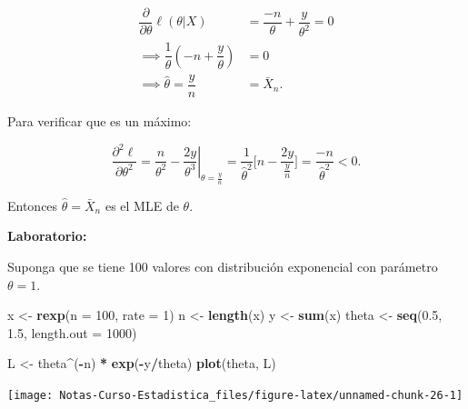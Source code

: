 \documentclass[
  12pt,
]{book}
\newenvironment{Shaded}{\begin{snugshade}}{\end{snugshade}}
\newcommand{\DataTypeTok}[1]{\textcolor[rgb]{0.13,0.29,0.53}{#1}}
\newcommand{\DecValTok}[1]{\textcolor[rgb]{0.00,0.00,0.81}{#1}}
\newcommand{\FloatTok}[1]{\textcolor[rgb]{0.00,0.00,0.81}{#1}}
\newcommand{\KeywordTok}[1]{\textcolor[rgb]{0.13,0.29,0.53}{\textbf{#1}}}
\newcommand{\NormalTok}[1]{#1}
\newcommand{\OperatorTok}[1]{\textcolor[rgb]{0.81,0.36,0.00}{\textbf{#1}}}
\newcommand{\StringTok}[1]{\textcolor[rgb]{0.31,0.60,0.02}{#1}}
\begin{document}
\begin{align*}
\dfrac{\partial}{\partial\theta} \ell(\theta|X) & = \dfrac{-n}{\theta}+\dfrac{y}{\theta^2} = 0 \\
\implies \dfrac{1}{\theta}\left(-n+\dfrac{y}\theta\right) & =0  \\
\implies \hat\theta = \dfrac{y}{n} & = \bar X_n.
\end{align*}

Para verificar que es un máximo:

\[\dfrac{\partial^2    \ell}{\partial\theta^2} = \left. \dfrac{n}{\theta^2} -\dfrac{2y}{\theta^3}\right\vert_{\theta = \frac{y}{n}} = \dfrac{1}{\hat\theta^2} \bigg[n-\dfrac{2y}{\frac yn}\bigg] = \dfrac{-n}{\hat\theta^2} < 0.\]

Entonces \(\hat\theta = \bar X_n\) es el MLE de \(\theta\).

\textbf{Laboratorio:}

Suponga que se tiene 100 valores con distribución exponencial con parámetro
\(\theta=1\).

\begin{Shaded}
\begin{Highlighting}[]
\NormalTok{x \textless{}{-}}\StringTok{ }\KeywordTok{rexp}\NormalTok{(}\DataTypeTok{n =} \DecValTok{100}\NormalTok{, }\DataTypeTok{rate =} \DecValTok{1}\NormalTok{)}
\NormalTok{n \textless{}{-}}\StringTok{ }\KeywordTok{length}\NormalTok{(x)}
\NormalTok{y \textless{}{-}}\StringTok{ }\KeywordTok{sum}\NormalTok{(x)}
\NormalTok{theta \textless{}{-}}\StringTok{ }\KeywordTok{seq}\NormalTok{(}\FloatTok{0.5}\NormalTok{, }\FloatTok{1.5}\NormalTok{, }\DataTypeTok{length.out =} \DecValTok{1000}\NormalTok{)}
\end{Highlighting}
\end{Shaded}

\begin{Shaded}
\begin{Highlighting}[]
\NormalTok{L \textless{}{-}}\StringTok{ }\NormalTok{theta}\OperatorTok{\^{}}\NormalTok{(}\OperatorTok{{-}}\NormalTok{n) }\OperatorTok{*}\StringTok{ }\KeywordTok{exp}\NormalTok{(}\OperatorTok{{-}}\NormalTok{y}\OperatorTok{/}\NormalTok{theta)}
\KeywordTok{plot}\NormalTok{(theta, L)}
\end{Highlighting}
\end{Shaded}

\begin{center}\texttt{[image: Notas-Curso-Estadistica\_files/figure-latex/unnamed-chunk-26-1]} \end{center}
\end{document}
